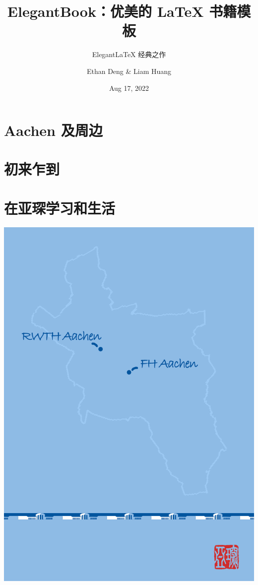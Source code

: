\documentclass[a4paper,lang=cn,10pt,newtx,scheme=chinese]{elegantbook}
\title{ElegantBook：优美的 \LaTeX{} 书籍模板}
\subtitle{Elegant\LaTeX{} 经典之作}
\author{Ethan Deng \& Liam Huang}
\institute{Elegant\LaTeX{} Program}
\date{Aug 17, 2022}
\begin{document}
\maketitle
\frontmatter

\tableofcontents

\mainmatter

\part{Aachen 及周边}




\part{初来乍到}










\part{在亚琛学习和生活}



\nocite{*}

\printbibliography[heading=bibintoc, title=\ebibname]
\appendix

\begin{titlepage}
\parindent=0pt
\includegraphics[width=\linewidth]{Bilder/Back_Cover_.jpg}
\end{titlepage}
\end{document}
